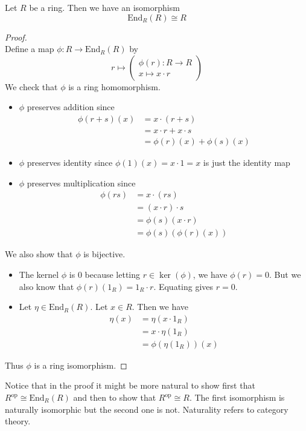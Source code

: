 \documentclass[a4paper]{article}
\begin{document}
\begin{prp}{}{} Let $R$ be a ring. Then we have an isomorphism $$\text{End}_R(R)\cong R$$ \tcbline
\begin{proof}~\\
Define a map $\phi:R\to\text{End}_R(R)$ by $$r\mapsto\begin{pmatrix}
\phi(r):R\to R\\x\mapsto x\cdot r
\end{pmatrix}$$ We check that $\phi$ is a ring homomorphism. 
\begin{itemize}
\item $\phi$ preserves addition since 
\begin{align*}
\phi(r+s)(x)&=x\cdot (r+s)\\
&=x\cdot r+x\cdot s\\
&=\phi(r)(x)+\phi(s)(x)
\end{align*}
\item $\phi$ preserves identity since $\phi(1)(x)=x\cdot 1=x$ is just the identity map
\item $\phi$ preserves multiplication since 
\begin{align*}
\phi(rs)&=x\cdot (rs)\\
&=(x\cdot r)\cdot s\\
&=\phi(s)(x\cdot r)\\
&=\phi(s)(\phi(r)(x))
\end{align*}
\end{itemize}
We also show that $\phi$ is bijective. 
\begin{itemize}
\item The kernel $\phi$ is $0$ because letting $r\in\ker(\phi)$, we have $\phi(r)=0$. But we also know that $\phi(r)(1_R)=1_R\cdot r$. Equating gives $r=0$. 
\item Let $\eta\in\text{End}_R(R)$. Let $x\in R$. Then we have 
\begin{align*}
\eta(x)&=\eta(x\cdot 1_R)\\
&=x\cdot\eta(1_R)\tag{$\eta$ is a module homomorphism}\\
&=\phi(\eta(1_R))(x)
\end{align*}
\end{itemize}
Thus $\phi$ is a ring isomorphism. 
\end{proof}
\end{prp}

Notice that in the proof it might be more natural to show first that $R^\text{op}\cong\text{End}_R(R)$ and then to show that $R^\text{op}\cong R$. The first isomorphism is naturally isomorphic but the second one is not. Naturality refers to category theory. 
\end{document}
